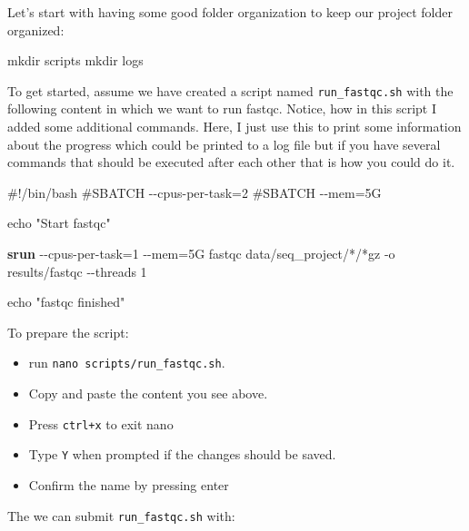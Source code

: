 \documentclass[
  letterpaper,
  DIV=11,
  numbers=noendperiod]{scrreprt}
\newenvironment{Shaded}{}{}
\newcommand{\AttributeTok}[1]{\textcolor[rgb]{0.84,0.23,0.29}{#1}}
\newcommand{\BuiltInTok}[1]{\textcolor[rgb]{0.84,0.23,0.29}{#1}}
\newcommand{\CommentTok}[1]{\textcolor[rgb]{0.42,0.45,0.49}{#1}}
\newcommand{\ExtensionTok}[1]{\textcolor[rgb]{0.84,0.23,0.29}{\textbf{#1}}}
\newcommand{\FunctionTok}[1]{\textcolor[rgb]{0.44,0.26,0.76}{#1}}
\newcommand{\NormalTok}[1]{\textcolor[rgb]{0.14,0.16,0.18}{#1}}
\newcommand{\OperatorTok}[1]{\textcolor[rgb]{0.14,0.16,0.18}{#1}}
\newcommand{\PreprocessorTok}[1]{\textcolor[rgb]{0.84,0.23,0.29}{#1}}
\newcommand{\StringTok}[1]{\textcolor[rgb]{0.01,0.18,0.38}{#1}}
\providecommand{\tightlist}{%
  \setlength{\itemsep}{0pt}\setlength{\parskip}{0pt}}\usepackage{longtable,booktabs,array}
\begin{document}
Let's start with having some good folder organization to keep our
project folder organized:

\begin{Shaded}
\begin{Highlighting}[]
\FunctionTok{mkdir}\NormalTok{ scripts }
\FunctionTok{mkdir}\NormalTok{ logs}
\end{Highlighting}
\end{Shaded}

To get started, assume we have created a script named
\texttt{run\_fastqc.sh} with the following content in which we want to
run fastqc. Notice, how in this script I added some additional commands.
Here, I just use this to print some information about the progress which
could be printed to a log file but if you have several commands that
should be executed after each other that is how you could do it.

\begin{Shaded}
\begin{Highlighting}[]
\CommentTok{\#!/bin/bash}
\CommentTok{\#SBATCH {-}{-}cpus{-}per{-}task=2}
\CommentTok{\#SBATCH {-}{-}mem=5G}

\BuiltInTok{echo} \StringTok{"Start fastqc"}

\ExtensionTok{srun} \AttributeTok{{-}{-}cpus{-}per{-}task}\OperatorTok{=}\NormalTok{1 }\AttributeTok{{-}{-}mem}\OperatorTok{=}\NormalTok{5G fastqc data/seq\_project/}\PreprocessorTok{*}\NormalTok{/}\PreprocessorTok{*}\NormalTok{gz }\AttributeTok{{-}o}\NormalTok{ results/fastqc  }\AttributeTok{{-}{-}threads}\NormalTok{ 1}

\BuiltInTok{echo} \StringTok{"fastqc finished"}
\end{Highlighting}
\end{Shaded}

To prepare the script:

\begin{itemize}
\tightlist
\item
  run \texttt{nano\ scripts/run\_fastqc.sh}.
\item
  Copy and paste the content you see above.
\item
  Press \texttt{ctrl+x} to exit nano
\item
  Type \texttt{Y} when prompted if the changes should be saved.
\item
  Confirm the name by pressing enter
\end{itemize}

The we can submit \texttt{run\_fastqc.sh} with:
\end{document}
